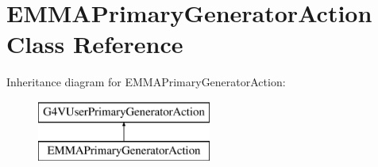 \hypertarget{classEMMAPrimaryGeneratorAction}{\section{E\-M\-M\-A\-Primary\-Generator\-Action Class Reference}
\label{classEMMAPrimaryGeneratorAction}
}
Inheritance diagram for E\-M\-M\-A\-Primary\-Generator\-Action\-:\begin{figure}[H]
\begin{center}
\leavevmode
\includegraphics[height=2.000000cm]{classEMMAPrimaryGeneratorAction}
\end{center}
\end{figure}
